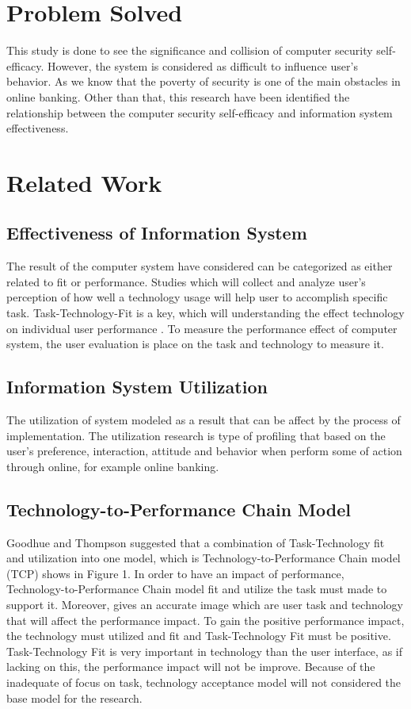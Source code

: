\documentclass[a4paper, 12pt]{article}
\begin{document}
\section{Problem Solved}

This study is done to see the significance and collision of computer security self-efficacy. However, the system is considered as difficult to influence user’s behavior. As we know that the poverty of security is one of the main obstacles in online banking. Other than that, this research have been identified the relationship between the computer security self-efficacy and information system effectiveness.

\section{Related Work}

\subsection{Effectiveness of Information System}

The result of the computer system have considered can be categorized as either related to fit or performance. Studies which will collect and analyze user’s perception of how well a technology usage will help user to accomplish specific task. Task-Technology-Fit is a key, which will understanding the effect technology on individual user performance \cite{al2012computer}. To measure the performance effect of computer system, the user evaluation is place on the task and technology to measure it.

\subsection{Information System Utilization}

The utilization of system modeled as a result that can be affect by the process of implementation. The utilization research is type of profiling that based on the user’s preference, interaction, attitude and behavior when perform some of action through online, for example online banking.

\subsection{Technology-to-Performance Chain Model}

Goodhue and Thompson \cite{goodhue1995task} suggested that a combination of Task-Technology fit and utilization into one model, which is Technology-to-Performance Chain model (TCP) shows in Figure 1. In order to have an impact of performance, Technology-to-Performance Chain model fit and utilize the task must made to support it. Moreover, gives an accurate image which are user task and technology that will affect the performance impact. To gain the positive performance impact, the technology must utilized and fit and Task-Technology Fit must be positive. Task-Technology Fit is very important in technology than the user interface, as if lacking on this, the performance impact will not be improve. Because of the inadequate of focus on task, technology acceptance model will not considered the base model for the research.
\end{document}
